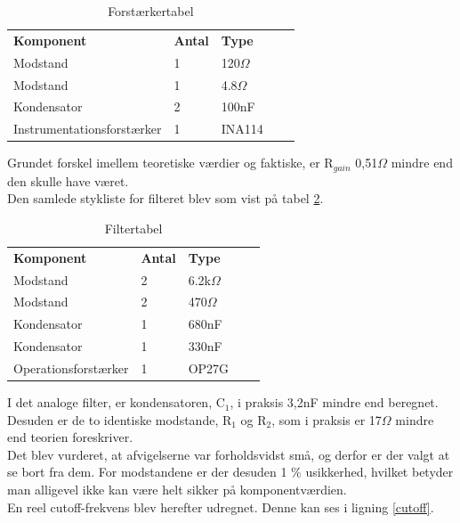 \begin{table}[H]
\centering
\begin{tabular}{l l l l l}
\textbf{Komponent} & \textbf{Antal} & \textbf{Type}  &  &  \\ \cline{1-3}
Modstand           & 1              & 120$\Omega$   &  &  \\ \cline{1-3}
Modstand           & 1              & 4.8$\Omega$   &  &  \\ \cline{1-3}
Kondensator        & 2              & 100nF         &  &  \\ \cline{1-3}
Instrumentationsforstærker &    1   & INA114		     &  &  \\ \cline{1-3}
\end{tabular}
\caption{Forstærkertabel}
\label{Forsttabel}
\end{table}

Grundet forskel imellem teoretiske værdier og faktiske, er R$_{gain}$ 0,51$\Omega$ mindre end den skulle have været.\\
Den samlede stykliste for filteret blev som vist på tabel \ref{Filtertabel}.

\begin{table}[H]
\centering
\begin{tabular}{lllll}
\textbf{Komponent} & \textbf{Antal} & \textbf{Type}  &  &  \\ \cline{1-3}
Modstand           & 2              & 6.2k$\Omega$ &  &  \\ \cline{1-3}
Modstand           & 2              & 470$\Omega$   &  &  \\ \cline{1-3}
Kondensator        & 1              & 680nF         &  &  \\ \cline{1-3}
Kondensator        & 1              & 330nF         &  &  \\ \cline{1-3}
Operationsforstærker &    1         & OP27G          &  &  \\ \cline{1-3}
\end{tabular}
\caption{Filtertabel}
\label{Filtertabel}
\end{table}

I det analoge filter, er kondensatoren, C$_1$, i praksis 3,2nF mindre end  beregnet. Desuden er de to identiske modstande, R$_1$ og R$_2$, som i praksis er 17$\Omega$ mindre end teorien foreskriver.\\
Det blev vurderet, at afvigelserne var forholdsvidst små, og derfor er der valgt at se bort fra dem. For modstandene er der desuden 1 \% usikkerhed, hvilket betyder man alligevel ikke kan være helt sikker på komponentværdien.\\
En reel cutoff-frekvens blev herefter udregnet. Denne kan ses i ligning \ref{cutoff}.


